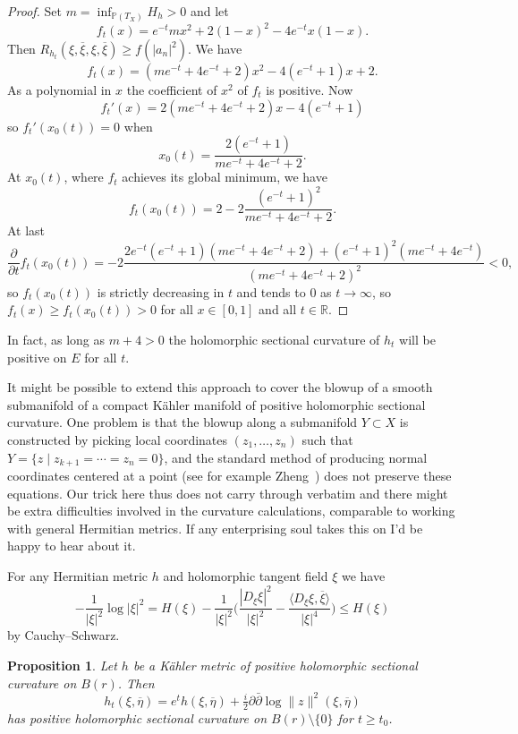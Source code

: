 \documentclass[10pt,a4paper]{amsart}
\newtheorem{prop}[theo]{Proposition}
\newcommand{\kk}[1]{\mathbb{#1}}
\def\<{\langle}
\def\>{\rangle}
\def\ov#1{\overline{#1}}
\def\hsc{holomorphic sectional curvature}
\begin{document}
\begin{proof}
Set $m = \inf_{\kk P(T_X)} H_h > 0$ and let
$$
f_t(x) = e^{-t} m x^2 + 2(1-x)^2 - 4e^{-t} x(1-x).
$$
Then $R_{h_t}(\xi, \ov\xi, \xi, \ov\xi) \geq f(|a_n|^2)$.
We have
$$
f_t(x)
= (m e^{-t} + 4e^{-t} + 2)x^2 - 4(e^{-t} + 1)x + 2.
$$
As a polynomial in $x$ the coefficient of $x^2$ of $f_t$ is positive.
Now
$$
f_t'(x)
= 2(m e^{-t} + 4e^{-t} + 2)x - 4(e^{-t} + 1)
$$
so $f_t'(x_0(t)) = 0$ when
$$
x_0(t) = \frac{2(e^{-t} + 1)}{m e^{-t} + 4e^{-t} + 2}.
$$
At $x_0(t)$, where $f_t$ achieves its global minimum, we have
$$
f_t(x_0(t))
=
2 - 2 \frac{(e^{-t} + 1)^2}{m e^{-t} + 4e^{-t} + 2}.
$$
At last
$$
\frac{\partial}{\partial t} f_t(x_0(t))
= -2 \frac{2e^{-t}(e^{-t}+1)(m e^{-t} + 4e^{-t} + 2) + (e^{-t}+1)^2(me^{-t}+4e^{-t})}{(m e^{-t} + 4e^{-t} + 2)^2}
< 0,
$$
so $f_t(x_0(t))$ is strictly decreasing in $t$ and tends to $0$ as $t \to
\infty$, so $f_t(x) \geq f_t(x_0(t)) > 0$ for all $x \in [0,1]$ and all $t \in
\kk R$.
\end{proof}

In fact, as long as $m + 4 > 0$ the \hsc{} of $h_t$ will be positive on $E$ for
all $t$.



It might be possible to extend this approach to cover the blowup of a smooth
submanifold of a compact K\"ahler manifold of positive \hsc.
One problem
is that the blowup along a submanifold $Y \subset X$ is
constructed by picking local coordinates $(z_1,\ldots,z_n)$ such that $Y = \{z
\mid z_{k+1} = \cdots = z_n = 0\}$,
and the standard method of producing normal coordinates centered at a point
(see for example Zheng~\cite{zheng2000complex})
does not preserve these equations.
Our trick here thus does not carry through verbatim and there might be extra
difficulties involved in the curvature calculations, comparable to working
with general Hermitian metrics.
If any enterprising soul takes this on I'd be happy to hear about it.


For any Hermitian metric $h$ and holomorphic tangent field $\xi$ we have
$$
- \frac{1}{|\xi|^2} \log |\xi|^2
= H(\xi)
- \frac{1}{|\xi|^2} \biggl(
\frac{|D_\xi \xi|^2}{|\xi|^2}
- \frac{\<D_\xi \xi, \ov \xi\>}{|\xi|^4}
\biggr)
\leq H(\xi)
$$
by Cauchy--Schwarz.


\begin{prop}
Let $h$ be a K\"ahler metric of positive \hsc{} on $B(r)$.
Then
$$
h_t(\xi, \ov\eta)
= e^t h(\xi, \ov\eta) + \tfrac i2 \partial \bar\partial \log \|z\|^2(\xi, \ov\eta)
$$
has positive \hsc{} on $B(r) \setminus\{0\}$ for $t \geq t_0$.
\end{prop}
\end{document}
